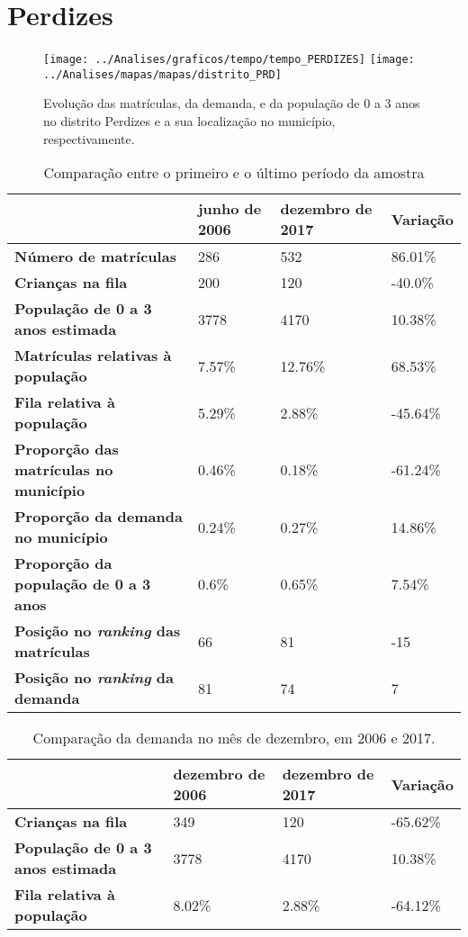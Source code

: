 \section{Perdizes}
\begin{figure}[H]
	\centering
	\texttt{[image: ../Analises/graficos/tempo/tempo\_PERDIZES]}
	\texttt{[image: ../Analises/mapas/mapas/distrito\_PRD]}
	\caption{Evolução das matrículas, da demanda, e da população de 0 a 3 anos no distrito Perdizes e a sua localização no município, respectivamente.}
\end{figure}
\begin{table}[H]
	\begin{tabular}{|l|l|l|l|}
		\hline
		\textbf{}                                      & \textbf{junho de 2006}       & \textbf{dezembro de 2017}    & \textbf{Variação} \\ \hline
		\textbf{Número de matrículas}                  & 286 & 532 & 86.01\% \\ \hline
		\textbf{Crianças na fila}                      & 200 & 120 & -40.0\% \\ \hline
		\textbf{População de 0 a 3 anos estimada}      & 3778 & 4170 & 10.38\% \\ \hline
		\textbf{Matrículas relativas à população}      & 7.57\% & 12.76\% & 68.53\% \\ \hline
		\textbf{Fila relativa à população}             & 5.29\% & 2.88\% & -45.64\% \\ \hline
		\textbf{Proporção das matrículas no município} & 0.46\% & 0.18\% & -61.24\% \\ \hline
		\textbf{Proporção da demanda no município}     & 0.24\% & 0.27\% & 14.86\% \\ \hline
		\textbf{Proporção da população de 0 a 3 anos}  & 0.6\% & 0.65\% & 7.54\% \\ \hline
		\textbf{Posição no \textit{ranking} das matrículas}     & 66 & 81 & -15 \\ \hline
		\textbf{Posição no \textit{ranking} da demanda}         & 81 & 74 & 7 \\ \hline
	\end{tabular}
	\caption{Comparação entre o primeiro e o último período da amostra}
\end{table}
\begin{table}[H]
	\begin{tabular}{|l|l|l|l|}
		\hline
		\textbf{}                                 & \textbf{dezembro de 2006} & \textbf{dezembro de 2017} & \textbf{Variação} \\ \hline
		\textbf{Crianças na fila}                      & 349 & 120 & -65.62\% \\ \hline
		\textbf{População de 0 a 3 anos estimada}      & 3778 & 4170 & 10.38\% \\ \hline
		\textbf{Fila relativa à população}             & 8.02\% & 2.88\% & -64.12\% \\ \hline
	\end{tabular}
	\caption{Comparação da demanda no mês de dezembro, em 2006 e 2017.}
\end{table}

